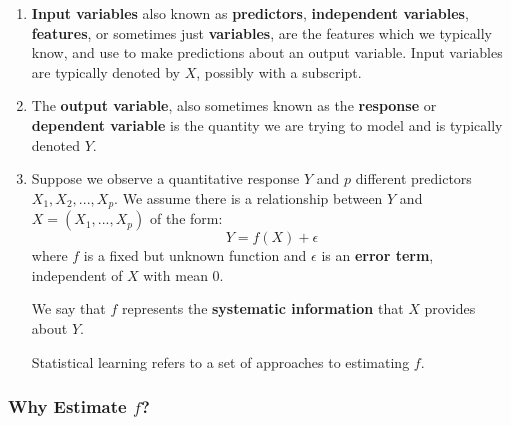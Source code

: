 \documentclass[10pt]{article}
\begin{document}
\begin{enumerate}	
	\item \textbf{Input variables} also known as \textbf{predictors}, \textbf{independent variables}, \textbf{features}, or sometimes just \textbf{variables}, are the features which we typically know, and use to make predictions about an output variable. Input variables are typically denoted by $X$, possibly with a subscript.
	\item The \textbf{output variable}, also sometimes known as the \textbf{response} or \textbf{dependent variable} is the quantity we are trying to model and is typically denoted $Y$.
	\item Suppose we observe a quantitative response $Y$ and $p$ different predictors $X_1, X_2, ..., X_p$.  We assume there is a relationship between $Y$ and $X = (X_1, ... , X_p)$ of the form:
	$$Y = f(X) + \epsilon$$
	where $f$ is a fixed but unknown function and $\epsilon$ is an \textbf{error term}, independent of $X$ with mean 0.
	
	We say that $f$ represents the \textbf{systematic information} that $X$ provides about $Y$.
	
	Statistical learning refers to a set of approaches to estimating $f$.
\end{enumerate}

\vspace{.2in} 

\subsubsection{Why Estimate $f$?}
\end{document}
